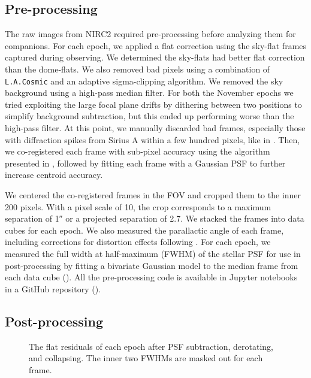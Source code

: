 \documentclass[twocolumn,linenumbers]{aastex631}
\begin{document}
\subsection{Pre-processing}\label{sec:pre-processing}

The raw images from NIRC2 required pre-processing before analyzing them for companions. For each epoch, we applied a flat correction using the sky-flat frames captured during observing. We determined the sky-flats had better flat correction than the dome-flats. We also removed bad pixels using a combination of \texttt{L.A.Cosmic} \citep{vandokkumCosmicRayRejectionLaplacian2001a} and an adaptive sigma-clipping algorithm. We removed the sky background using a high-pass median filter. For both the November epochs we tried exploiting the large focal plane drifts by dithering between two positions to simplify background subtraction, but this ended up performing worse than the high-pass filter. At this point, we manually discarded bad frames, especially those with diffraction spikes from Sirius A within a few hundred pixels, like in . Then, we co-registered each frame with sub-pixel accuracy using the algorithm presented in \citet{guizar-sicairosEfficientSubpixelImage2008}, followed by fitting each frame with a Gaussian PSF to further increase centroid accuracy.

We centered the co-registered frames in the FOV and cropped them to the inner 200 pixels. With a pixel scale of \qty{10}{\milliarcsecond}, the crop corresponds to a maximum separation of \ang{;;1} or a projected separation of \qty{2.7}{\au}. We stacked the frames into data cubes for each epoch. We also measured the parallactic angle of each frame, including corrections for distortion effects following \citet{yeldaImprovingGalacticCenter2010}. For each epoch, we measured the full width at half-maximum (FWHM) of the stellar PSF for use in post-processing by fitting a bivariate Gaussian model to the median frame from each data cube (). All the pre-processing code is available in Jupyter notebooks in a GitHub repository ().

\subsection{Post-processing}

\begin{figure*}
    \centering
    \caption{The flat residuals of each epoch after PSF subtraction, derotating, and collapsing. The inner two FWHMs are masked out for each frame.}
    \label{fig:residuals}
\end{figure*}
\end{document}
